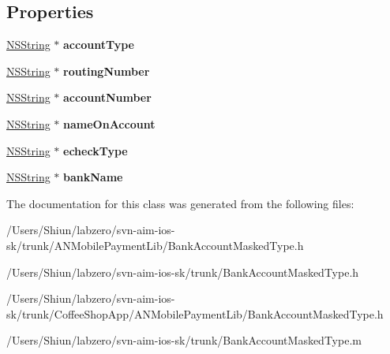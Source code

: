 \subsection*{Properties}
\begin{DoxyCompactItemize}
\item 
\hypertarget{interface_bank_account_masked_type_a7d7a909b399195b525f51f2ae392c5b1}{
\hyperlink{class_n_s_string}{NSString} $\ast$ {\bfseries accountType}}
\label{interface_bank_account_masked_type_a7d7a909b399195b525f51f2ae392c5b1}

\item 
\hypertarget{interface_bank_account_masked_type_a6e657f18f061f59d5dd012ef24b3cdfb}{
\hyperlink{class_n_s_string}{NSString} $\ast$ {\bfseries routingNumber}}
\label{interface_bank_account_masked_type_a6e657f18f061f59d5dd012ef24b3cdfb}

\item 
\hypertarget{interface_bank_account_masked_type_acf5c146fa205da18a1b53551f82695e1}{
\hyperlink{class_n_s_string}{NSString} $\ast$ {\bfseries accountNumber}}
\label{interface_bank_account_masked_type_acf5c146fa205da18a1b53551f82695e1}

\item 
\hypertarget{interface_bank_account_masked_type_ae70f1f61ddef14d7a4969e856337ea2a}{
\hyperlink{class_n_s_string}{NSString} $\ast$ {\bfseries nameOnAccount}}
\label{interface_bank_account_masked_type_ae70f1f61ddef14d7a4969e856337ea2a}

\item 
\hypertarget{interface_bank_account_masked_type_a24175db095ef755dd30354de351864d0}{
\hyperlink{class_n_s_string}{NSString} $\ast$ {\bfseries echeckType}}
\label{interface_bank_account_masked_type_a24175db095ef755dd30354de351864d0}

\item 
\hypertarget{interface_bank_account_masked_type_a84bed520b33cc09243f8f5a31729632f}{
\hyperlink{class_n_s_string}{NSString} $\ast$ {\bfseries bankName}}
\label{interface_bank_account_masked_type_a84bed520b33cc09243f8f5a31729632f}

\end{DoxyCompactItemize}


The documentation for this class was generated from the following files:\begin{DoxyCompactItemize}
\item 
/Users/Shiun/labzero/svn-\/aim-\/ios-\/sk/trunk/ANMobilePaymentLib/BankAccountMaskedType.h\item 
/Users/Shiun/labzero/svn-\/aim-\/ios-\/sk/trunk/BankAccountMaskedType.h\item 
/Users/Shiun/labzero/svn-\/aim-\/ios-\/sk/trunk/CoffeeShopApp/ANMobilePaymentLib/BankAccountMaskedType.h\item 
/Users/Shiun/labzero/svn-\/aim-\/ios-\/sk/trunk/BankAccountMaskedType.m\end{DoxyCompactItemize}
